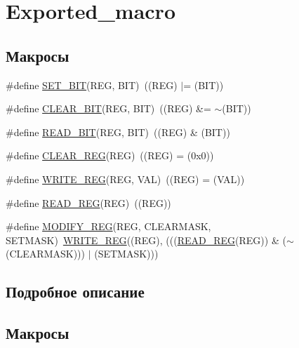 \hypertarget{group___exported__macro}{}\section{Exported\+\_\+macro}
\label{group___exported__macro}
\subsection*{Макросы}
\begin{DoxyCompactItemize}
\item 
\#define \mbox{\hyperlink{group___exported__macro_ga26474f43799fbade9cf300e21dd3a91a}{S\+E\+T\+\_\+\+B\+IT}}(R\+EG,  B\+IT)~((R\+EG) $\vert$= (B\+IT))
\item 
\#define \mbox{\hyperlink{group___exported__macro_ga133aae6fc0d41bffab39ab223a7001de}{C\+L\+E\+A\+R\+\_\+\+B\+IT}}(R\+EG,  B\+IT)~((R\+EG) \&= $\sim$(B\+IT))
\item 
\#define \mbox{\hyperlink{group___exported__macro_ga822bb1bb9710d5f2fa6396b84e583c33}{R\+E\+A\+D\+\_\+\+B\+IT}}(R\+EG,  B\+IT)~((R\+EG) \& (B\+IT))
\item 
\#define \mbox{\hyperlink{group___exported__macro_ga1378fbdda39f40b85420df55f41460ef}{C\+L\+E\+A\+R\+\_\+\+R\+EG}}(R\+EG)~((R\+EG) = (0x0))
\item 
\#define \mbox{\hyperlink{group___exported__macro_ga32f78bffcaf6d13023dcd7f05e0c4d57}{W\+R\+I\+T\+E\+\_\+\+R\+EG}}(R\+EG,  V\+AL)~((R\+EG) = (V\+AL))
\item 
\#define \mbox{\hyperlink{group___exported__macro_gae7f188a4d26c9e713a48414783421071}{R\+E\+A\+D\+\_\+\+R\+EG}}(R\+EG)~((R\+EG))
\item 
\#define \mbox{\hyperlink{group___exported__macro_ga6553c99f510c3bab8cc0a91602053247}{M\+O\+D\+I\+F\+Y\+\_\+\+R\+EG}}(R\+EG,  C\+L\+E\+A\+R\+M\+A\+SK,  S\+E\+T\+M\+A\+SK)~\mbox{\hyperlink{group___exported__macro_ga32f78bffcaf6d13023dcd7f05e0c4d57}{W\+R\+I\+T\+E\+\_\+\+R\+EG}}((R\+EG), (((\mbox{\hyperlink{group___exported__macro_gae7f188a4d26c9e713a48414783421071}{R\+E\+A\+D\+\_\+\+R\+EG}}(R\+EG)) \& ($\sim$(C\+L\+E\+A\+R\+M\+A\+SK))) $\vert$ (S\+E\+T\+M\+A\+SK)))
\end{DoxyCompactItemize}


\subsection{Подробное описание}


\subsection{Макросы}
\mbox{\label{group___exported__macro_ga133aae6fc0d41bffab39ab223a7001de}} 
